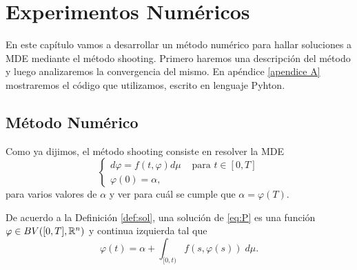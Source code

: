 \chapter{Experimentos Numéricos}

En este capítulo vamos a desarrollar un método numérico para hallar soluciones a MDE mediante el método shooting. Primero haremos una descripción del método y luego analizaremos la convergencia del mismo. En apéndice  \ref{apendice A} mostraremos el código que utilizamos, escrito en lenguaje Pyhton.

\section{Método Numérico }



Como ya dijimos, el método shooting consiste en resolver la MDE
\begin{equation}\label{eq:P}
\left\lbrace \begin{array}{lc}
d\varphi=f(t,\varphi) d\mu& \text{ para } t\in [0,T]\\
\varphi(0)=\alpha,
\end{array}\right. \tag{$P$}
\end{equation} 
para varios valores de $\alpha$ y ver para cuál se cumple que  $\alpha=\varphi(T)$.

De acuerdo a  la Definición \ref{def:sol},  una solución de \eqref{eq:P} es una función $\varphi\in  BV([0,T],\mathbb{R}^n)$ y continua izquierda tal que
\begin{equation}\label{eq:integral}
    \varphi(t)=\alpha+\int_{[0,t)}f(s,\varphi(s)) \;d\mu.
\end{equation}

